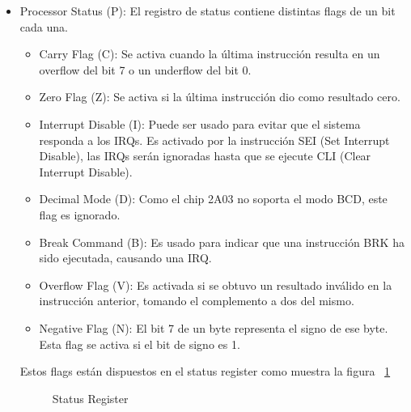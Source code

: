 \begin{itemize}
\item Processor Status (P): El registro de status contiene distintas flags de un bit cada una.
\begin{itemize}
\item Carry Flag (C): Se activa cuando la última instrucción resulta en un overflow del bit 7 o un underflow del bit 0.
\item Zero Flag (Z): Se activa si la última instrucción dio como resultado cero.
\item Interrupt Disable (I): Puede ser usado para evitar que el sistema responda a los IRQs. Es activado por la instrucción SEI (Set Interrupt Disable), las IRQs serán ignoradas hasta que se ejecute CLI (Clear Interrupt Disable).
\item Decimal Mode (D): Como el chip 2A03 no soporta el modo BCD, este flag es ignorado.
\item Break Command (B): Es usado para indicar que una instrucción BRK ha sido ejecutada, causando una IRQ.
\item Overflow Flag (V): Es activada si se obtuvo un resultado inválido en la instrucción anterior, tomando el complemento a dos del mismo.
\item Negative Flag (N): El bit 7 de un byte representa el signo de ese byte. Esta flag se activa si el bit de signo es 1.
\end{itemize}
Estos flags están dispuestos en el status register como muestra la figura ~\ref{fig:status}
\begin{figure}[H]\caption{Status Register\label{fig:status}}
\end{figure}
\end{itemize}

